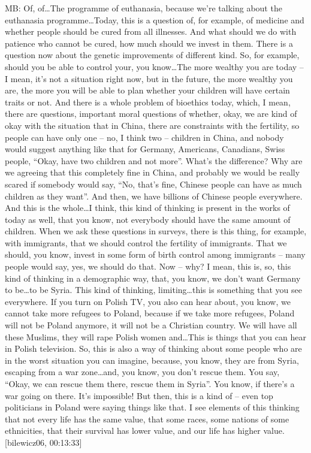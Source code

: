 MB: Of, of…The programme of euthanasia, because we’re talking about the euthanasia programme…Today, this is a question of, for example, of medicine and whether people should be cured from all illnesses. And what should we do with patience who cannot be cured, how much should we invest in them. There is a question now about the genetic improvements of different kind. So, for example, should you be able to control your, you know…The more wealthy you are today – I mean, it’s not a situation right now, but in the future, the more wealthy you are, the more you will be able to plan whether your children will have certain traits or not. And there is a whole problem of bioethics today, which, I mean, there are questions, important moral questions of whether, okay, we are kind of okay with the situation that in China, there are constraints with the fertility, so people can have only one – no, I think two – children in China, and nobody would suggest anything like that for Germany, Americans, Canadians, Swiss people, “Okay, have two children and not more”. What’s the difference? Why are we agreeing that this completely fine in China, and probably we would be really scared if somebody would say, “No, that’s fine, Chinese people can have as much children as they want”. And then, we have billions of Chinese people everywhere. And this is the whole…I think, this kind of thinking is present in the works of today as well, that you know, not everybody should have the same amount of children. When we ask these questions in surveys, there is this thing, for example, with immigrants, that we should control the fertility of immigrants. That we should, you know, invest in some form of birth control among immigrants – many people would say, yes, we should do that. Now – why? I mean, this is, so, this kind of thinking in a demographic way, that, you know, we don’t want Germany to be…to be Syria. This kind of thinking, limiting…this is something that you see everywhere. If you turn on Polish TV, you also can hear about, you know, we cannot take more refugees to Poland, because if we take more refugees, Poland will not be Poland anymore, it will not be a Christian country. We will have all these Muslims, they will rape Polish women and…This is things that you can hear in Polish television. So, this is also a way of thinking about some people who are in the worst situation you can imagine, because, you know, they are from Syria, escaping from a war zone…and, you know, you don’t rescue them. You say, “Okay, we can rescue them there, rescue them in Syria”. You know, if there’s a war going on there. It’s impossible! But then, this is a kind of – even top politicians in Poland were saying things like that. I see elements of this thinking that not every life has the same value, that some races, some nations of some ethnicities, that their survival has lower value, and our life has higher value. [bilewicz06, 00:13:33] 

